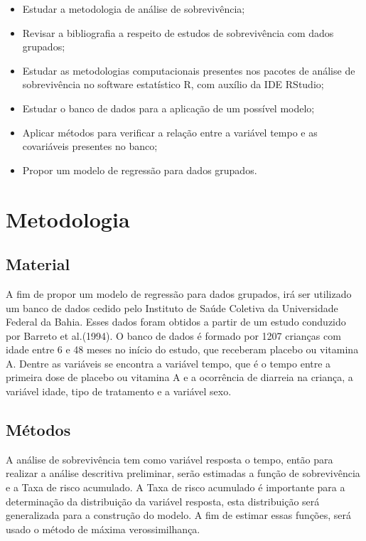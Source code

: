 \documentclass[a4paper,12pt]{article}
\begin{document}
\begin{itemize}
	
	\item Estudar a metodologia de análise de sobrevivência;
	\item Revisar a bibliografia a respeito de estudos de sobrevivência com dados grupados;	
	\item Estudar as metodologias computacionais presentes nos pacotes de análise de sobrevivência no software estatístico R, com auxílio da IDE RStudio;
	\item Estudar o banco de dados para a aplicação de um possível modelo;
	\item Aplicar métodos para verificar a relação entre a variável tempo e as covariáveis presentes no banco;
	\item Propor um modelo de regressão para dados grupados.
\end{itemize}

\vspace{1cm}
\newpage
\section{Metodologia}
\noindent

\subsection{Material}

A fim de propor um modelo de regressão para dados grupados, irá ser utilizado um banco de dados cedido pelo Instituto de Saúde Coletiva da Universidade Federal da Bahia. Esses dados foram obtidos a partir de um estudo conduzido por Barreto et al.(1994). O banco de dados é formado por 1207 crianças com idade entre 6 e 48 meses no início do estudo, que receberam placebo ou vitamina A. Dentre as variáveis se encontra a variável tempo, que é o tempo entre a primeira dose de placebo ou vitamina A e a ocorrência de diarreia na criança, a variável idade, tipo de tratamento e a variável sexo.

\subsection{Métodos}

A análise de sobrevivência tem como variável resposta o tempo, então para realizar a análise descritiva preliminar, serão estimadas a função de sobrevivência e a Taxa de risco acumulado. A Taxa de risco acumulado é importante para a determinação da distribuição da variável resposta, esta distribuição será generalizada para a construção do modelo. A fim de estimar essas funções, será usado o método de máxima verossimilhança.
\end{document}
